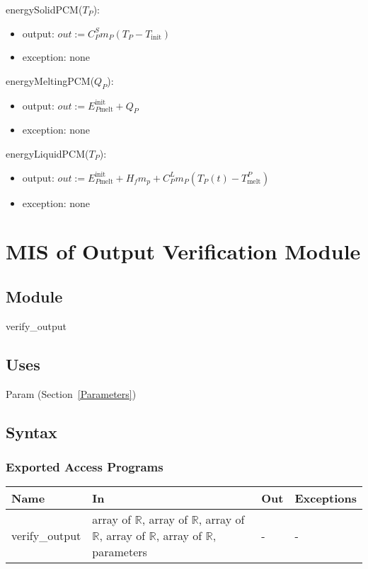 \documentclass[12pt]{article}
\begin{document}
energySolidPCM($T_P$): 
\renewcommand*{\arraystretch}{1.5}
\begin{itemize}
\item output: $out := C^S_P m_P (T_P - T_\text{init})$
\item exception: none
\end{itemize}

energyMeltingPCM($Q_P$): 
\renewcommand*{\arraystretch}{1.5}
\begin{itemize}
\item output: $out := E_{P\text{melt}}^{\text{init}} + Q_P$
\item exception: none
\end{itemize}

energyLiquidPCM($T_P$): 
\renewcommand*{\arraystretch}{1.5}
\begin{itemize}
\item output: $out := E_{P\text{melt}}^{\text{init}}+H_f m_p + C_P^L m_P(T_P(t) - T_\text{melt}^P)$
\item exception: none
\end{itemize}

\newpage
\section{MIS of Output Verification Module} \label{VerifyOutput}

\subsection{Module}

verify\_output

\subsection{Uses}

Param (Section~\ref{Parameters})

\subsection{Syntax}

\subsubsection{Exported Access Programs}

\begin{center}
\begin{tabular}{p{3cm} p{7cm} p{2cm} p{2cm}}
\hline
\textbf{Name} & \textbf{In} & \textbf{Out} & \textbf{Exceptions} \\
\hline
verify\_output & array of $\mathbb{R}$, array of $\mathbb{R}$, array of $\mathbb{R}$, array of $\mathbb{R}$, array of $\mathbb{R}$, parameters & - & - \\
\hline
\end{tabular}
\end{center}
\end{document}
